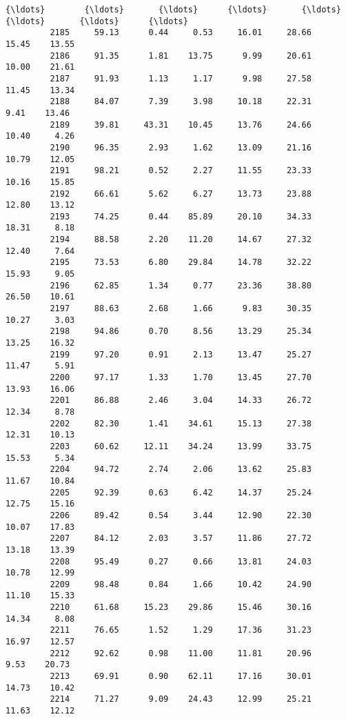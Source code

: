 \documentclass[11pt]{llncs}
\begin{document}
\begin{Verbatim}[commandchars=\\\{\}]
         {\ldots}        {\ldots}       {\ldots}      {\ldots}       {\ldots}       {\ldots}       {\ldots}      {\ldots}   
         2185     59.13      0.44     0.53     16.01     28.66     15.45    13.55   
         2186     91.35      1.81    13.75      9.99     20.61     10.00    21.61   
         2187     91.93      1.13     1.17      9.98     27.58     11.45    13.34   
         2188     84.07      7.39     3.98     10.18     22.31      9.41    13.46   
         2189     39.81     43.31    10.45     13.76     24.66     10.40     4.26   
         2190     96.35      2.93     1.62     13.09     21.16     10.79    12.05   
         2191     98.21      0.52     2.27     11.55     23.33     10.16    15.85   
         2192     66.61      5.62     6.27     13.73     23.88     12.80    13.12   
         2193     74.25      0.44    85.89     20.10     34.33     18.31     8.18   
         2194     88.58      2.20    11.20     14.67     27.32     12.40     7.64   
         2195     73.53      6.80    29.84     14.78     32.22     15.93     9.05   
         2196     62.85      1.34     0.77     23.36     38.80     26.50    10.61   
         2197     88.63      2.68     1.66      9.83     30.35     10.27     3.03   
         2198     94.86      0.70     8.56     13.29     25.34     13.25    16.32   
         2199     97.20      0.91     2.13     13.47     25.27     11.47     5.91   
         2200     97.17      1.33     1.70     13.45     27.70     13.93    16.06   
         2201     86.88      2.46     3.04     14.33     26.72     12.34     8.78   
         2202     82.30      1.41    34.61     15.13     27.38     12.31    10.13   
         2203     60.62     12.11    34.24     13.99     33.75     15.53     5.34   
         2204     94.72      2.74     2.06     13.62     25.83     11.67    10.84   
         2205     92.39      0.63     6.42     14.37     25.24     12.75    15.16   
         2206     89.42      0.54     3.44     12.90     22.30     10.07    17.83   
         2207     84.12      2.03     3.57     11.86     27.72     13.18    13.39   
         2208     95.49      0.27     0.66     13.81     24.03     10.78    12.99   
         2209     98.48      0.84     1.66     10.42     24.90     11.10    15.33   
         2210     61.68     15.23    29.86     15.46     30.16     14.34     8.08   
         2211     76.65      1.52     1.29     17.36     31.23     16.97    12.57   
         2212     92.62      0.98    11.00     11.81     20.96      9.53    20.73   
         2213     69.91      0.90    62.11     17.16     30.01     14.73    10.42   
         2214     71.27      9.09    24.43     12.99     25.21     11.63    12.12   
         

\end{Verbatim}
\end{document}
